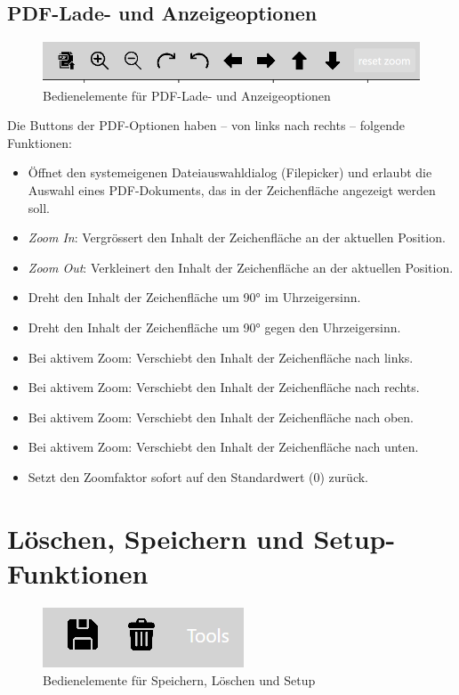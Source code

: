 \clearpage

\subsection{PDF-Lade- und Anzeigeoptionen}
\begin{figure}[H]
    \centering
    \includegraphics[width=0.5\linewidth]{graphics/pdf_options.png}
    \caption{Bedienelemente für PDF-Lade- und Anzeigeoptionen}
    \label{fig:pdf_options}
\end{figure}

Die Buttons der PDF-Optionen haben – von links nach rechts – folgende Funktionen:
\begin{itemize}
    \item Öffnet den systemeigenen Dateiauswahldialog (Filepicker) und erlaubt die Auswahl eines PDF-Dokuments, das in der Zeichenfläche angezeigt werden soll.
    \item \emph{Zoom In}: Vergrössert den Inhalt der Zeichenfläche an der aktuellen Position.
    \item \emph{Zoom Out}: Verkleinert den Inhalt der Zeichenfläche an der aktuellen Position.
    \item Dreht den Inhalt der Zeichenfläche um 90° im Uhrzeigersinn.
    \item Dreht den Inhalt der Zeichenfläche um 90° gegen den Uhrzeigersinn.
    \item Bei aktivem Zoom: Verschiebt den Inhalt der Zeichenfläche nach links.
    \item Bei aktivem Zoom: Verschiebt den Inhalt der Zeichenfläche nach rechts.
    \item Bei aktivem Zoom: Verschiebt den Inhalt der Zeichenfläche nach oben.
    \item Bei aktivem Zoom: Verschiebt den Inhalt der Zeichenfläche nach unten.
    \item Setzt den Zoomfaktor sofort auf den Standardwert (0) zurück.
\end{itemize}
\section{Löschen, Speichern und Setup-Funktionen}
\begin{figure}[H]
    \centering
    \includegraphics[width=0.5\linewidth]{graphics/setup_funktionen.png}
    \caption{Bedienelemente für Speichern, Löschen und Setup}
    \label{fig:setup_funktionen}
\end{figure}

